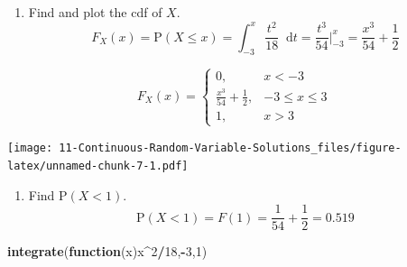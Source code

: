 \documentclass[
]{book}
\newenvironment{Shaded}{\begin{snugshade}}{\end{snugshade}}
\newcommand{\ControlFlowTok}[1]{\textcolor[rgb]{0.13,0.29,0.53}{\textbf{#1}}}
\newcommand{\DataTypeTok}[1]{\textcolor[rgb]{0.13,0.29,0.53}{#1}}
\newcommand{\DecValTok}[1]{\textcolor[rgb]{0.00,0.00,0.81}{#1}}
\newcommand{\FloatTok}[1]{\textcolor[rgb]{0.00,0.00,0.81}{#1}}
\newcommand{\KeywordTok}[1]{\textcolor[rgb]{0.13,0.29,0.53}{\textbf{#1}}}
\newcommand{\NormalTok}[1]{#1}
\newcommand{\OperatorTok}[1]{\textcolor[rgb]{0.81,0.36,0.00}{\textbf{#1}}}
\newcommand{\StringTok}[1]{\textcolor[rgb]{0.31,0.60,0.02}{#1}}
\providecommand{\tightlist}{%
  \setlength{\itemsep}{0pt}\setlength{\parskip}{0pt}}
\begin{document}
\begin{enumerate}
\def\labelenumi{\alph{enumi}.}
\setcounter{enumi}{2}
\tightlist
\item
  Find and plot the cdf of \(X\).
  \[
  F_X(x)=\mbox{P}(X\leq x)=\int_{-3}^x \frac{t^2}{18}\mathop{}\!\mathrm{d}t = \frac{t^3}{54}\bigg|_{-3}^x = \frac{x^3}{54}+\frac{1}{2}
  \]
\end{enumerate}

\[
F_X(x)=\left\{\begin{array}{ll} 0, & x<-3 \\ \frac{x^3}{54}+\frac{1}{2}, & -3\leq x \leq 3 \\ 1, & x>3 \end{array}\right.
\]

\begin{Shaded}
\end{Shaded}

\texttt{[image: 11-Continuous-Random-Variable-Solutions\_files/figure-latex/unnamed-chunk-7-1.pdf]}

\begin{enumerate}
\def\labelenumi{\alph{enumi}.}
\setcounter{enumi}{3}
\tightlist
\item
  Find \(\mbox{P}(X<1)\).
  \[
  \mbox{P}(X<1)=F(1)=\frac{1}{54}+\frac{1}{2}=0.519
  \]
\end{enumerate}

\begin{Shaded}
\begin{Highlighting}[]
\KeywordTok{integrate}\NormalTok{(}\ControlFlowTok{function}\NormalTok{(x)x}\OperatorTok{^}\DecValTok{2}\OperatorTok{/}\DecValTok{18}\NormalTok{,}\OperatorTok{-}\DecValTok{3}\NormalTok{,}\DecValTok{1}\NormalTok{)}
\end{Highlighting}
\end{Shaded}
\end{document}
